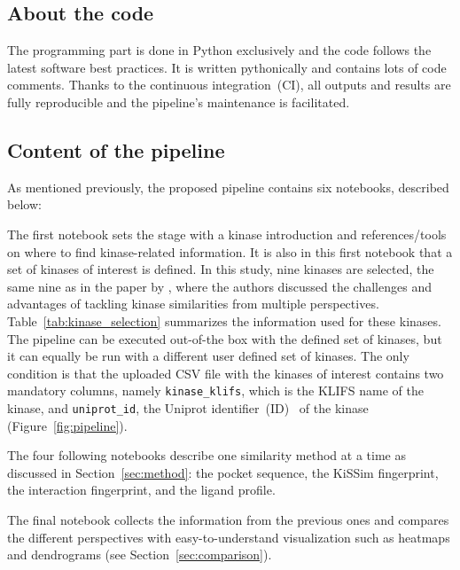 \documentclass[9pt,training]{livecoms}
\begin{document}
\subsection{About the code}
The programming part is done in Python exclusively and the code follows the latest software best practices. It is written pythonically and contains lots of code comments.
Thanks to the continuous integration~(CI), all outputs and results are fully reproducible and the pipeline's maintenance is facilitated.

\subsection{Content of the pipeline}
As mentioned previously, the proposed pipeline contains six notebooks, described below:

The first notebook sets the stage with a kinase introduction and references/tools on where to find kinase-related information. It is also in this first notebook that a set of kinases of interest is defined. In this study, nine kinases are selected, the same nine as in the paper by \citet{Schmidt_2021_molecules}, where the authors discussed the challenges and advantages of tackling kinase similarities from multiple perspectives. Table~\ref{tab:kinase_selection} summarizes the information used for these kinases.
The pipeline can be executed out-of-the box with the defined set of kinases, but it can equally be run with a different user defined set of kinases. The only condition is that the uploaded CSV file with the kinases of interest contains two mandatory columns, namely \texttt{kinase\_klifs}, which is the KLIFS name of the kinase, and \texttt{uniprot\_id}, the Uniprot identifier~(ID)~\cite{uniprot_consortium_2020_nar} of the kinase (Figure~\ref{fig:pipeline}).

The four following notebooks describe one similarity method at a time as discussed in Section~\ref{sec:method}: the pocket sequence, the KiSSim fingerprint, the interaction fingerprint, and the ligand profile.

The final notebook collects the information from the previous ones and compares the different perspectives with easy-to-understand visualization such as heatmaps and dendrograms (see Section~\ref{sec:comparison}).
\end{document}
